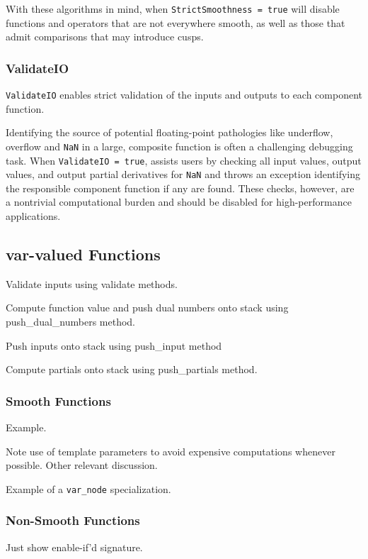 With these algorithms in mind, when \verb|StrictSmoothness = true| 
\nomad will disable functions and operators that are not everywhere 
smooth, as well as those that admit comparisons that may introduce cusps.

\subsubsection{ValidateIO}

\verb|ValidateIO| enables strict validation of the inputs and outputs
to each component function.

Identifying the source of potential floating-point pathologies like
underflow, overflow and \verb|NaN| in a large, composite function
is often a challenging debugging task.  When \verb|ValidateIO = true|,
\nomad assists users by checking all input values, output values,
and output partial derivatives for \verb|NaN| and throws an
exception identifying the responsible component function if any
are found.  These checks, however, are a nontrivial computational
burden and should be disabled for high-performance applications.

\subsection{var-valued Functions}

Validate inputs using validate methods.

Compute function value and push dual numbers onto stack
using push\_dual\_numbers method.

Push inputs onto stack using push\_input method

Compute partials onto stack using push\_partials method.

\subsubsection{Smooth Functions}

Example.

Note use of template parameters to avoid expensive computations
whenever possible.  Other relevant discussion.

Example of a \verb|var_node| specialization.

\subsubsection{Non-Smooth Functions}

Just show enable-if'd signature.

